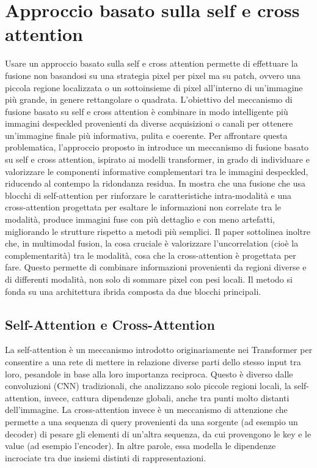 \section{Approccio basato sulla self e cross attention}
Usare un approccio basato sulla self e cross attention permette di effettuare la fusione non basandosi su una strategia 
pixel per pixel ma su patch, ovvero 
una piccola regione localizzata o un sottoinsieme di pixel all'interno di 
un'immagine più grande, in genere rettangolare o quadrata.
L’obiettivo del meccanismo di fusione basato su self e cross attention è combinare 
in modo intelligente più immagini despeckled provenienti da diverse acquisizioni o canali per ottenere un’immagine finale più informativa, pulita e coerente. 
Per affrontare questa problematica, l’approccio proposto in \cite{li2024crossfuse} introduce un meccanismo di fusione basato su self e cross attention, ispirato ai modelli 
transformer, in grado di individuare e valorizzare le componenti informative complementari tra le immagini despeckled, riducendo al contempo la ridondanza residua.
In \cite{li2024crossfuse} mostra che una 
fusione che usa blocchi di self-attention per rinforzare le caratteristiche intra-modalità  
e una cross-attention progettata per esaltare le informazioni non correlate tra le modalità, produce immagini 
fuse con più dettaglio e con meno artefatti, migliorando le strutture rispetto a metodi più semplici. 
Il paper sottolinea inoltre che, in multimodal fusion, la cosa cruciale è valorizzare l’uncorrelation (cioè la complementarità) tra le modalità, 
cosa che la cross-attention è progettata per fare. Questo permette di combinare 
informazioni provenienti da regioni diverse e di differenti modalità, non solo di sommare pixel con pesi locali. 
Il metodo si fonda su una architettura ibrida composta da due blocchi principali.

\subsection{Self-Attention e Cross-Attention}
La self-attention è un meccanismo introdotto originariamente nei Transformer per consentire a 
una rete di mettere in relazione diverse parti dello stesso input tra loro, pesandole in base alla loro importanza reciproca.
Questo è diverso dalle convoluzioni (CNN) tradizionali, che analizzano solo piccole regioni locali, la self-attention, invece, 
cattura dipendenze globali, anche tra punti molto distanti dell’immagine. La cross-attention \cite{vaswani2023attentionneed} invece 
è un meccanismo di attenzione che permette a una sequenza di query provenienti da una sorgente 
(ad esempio un decoder) di pesare gli elementi di un’altra sequenza, da cui provengono le key e le value (ad esempio l’encoder).
In altre parole, essa modella le dipendenze incrociate tra due insiemi distinti di rappresentazioni.
